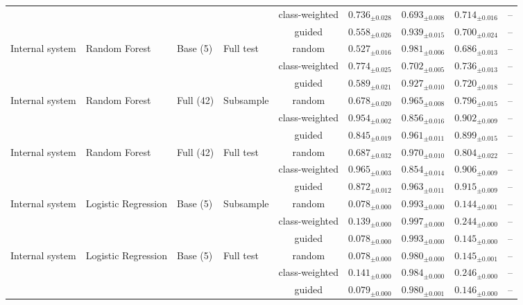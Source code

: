 \begin{longtable}{llllcccc}
 &  &  &  & class-weighted & $0.736_{\pm 0.028}$ & $0.693_{\pm 0.008}$ & $0.714_{\pm 0.016}$ & -- \\
 &  &  &  & guided & $0.558_{\pm 0.026}$ & $0.939_{\pm 0.015}$ & $0.700_{\pm 0.024}$ & -- \\
\addlinespace
Internal system & Random Forest & Base (5) & Full test & random & $0.527_{\pm 0.016}$ & $0.981_{\pm 0.006}$ & $0.686_{\pm 0.013}$ & -- \\
 &  &  &  & class-weighted & $0.774_{\pm 0.025}$ & $0.702_{\pm 0.005}$ & $0.736_{\pm 0.013}$ & -- \\
 &  &  &  & guided & $0.589_{\pm 0.021}$ & $0.927_{\pm 0.010}$ & $0.720_{\pm 0.018}$ & -- \\
\addlinespace
Internal system & Random Forest & Full (42) & Subsample & random & $0.678_{\pm 0.020}$ & $0.965_{\pm 0.008}$ & $0.796_{\pm 0.015}$ & -- \\
 &  &  &  & class-weighted & $0.954_{\pm 0.002}$ & $0.856_{\pm 0.016}$ & $0.902_{\pm 0.009}$ & -- \\
 &  &  &  & guided & $0.845_{\pm 0.019}$ & $0.961_{\pm 0.011}$ & $0.899_{\pm 0.015}$ & -- \\
\addlinespace
Internal system & Random Forest & Full (42) & Full test & random & $0.687_{\pm 0.032}$ & $0.970_{\pm 0.010}$ & $0.804_{\pm 0.022}$ & -- \\
 &  &  &  & class-weighted & $0.965_{\pm 0.003}$ & $0.854_{\pm 0.014}$ & $0.906_{\pm 0.009}$ & -- \\
 &  &  &  & guided & $0.872_{\pm 0.012}$ & $0.963_{\pm 0.011}$ & $0.915_{\pm 0.009}$ & -- \\
\addlinespace
Internal system & Logistic Regression & Base (5) & Subsample & random & $0.078_{\pm 0.000}$ & $0.993_{\pm 0.000}$ & $0.144_{\pm 0.001}$ & -- \\
 &  &  &  & class-weighted & $0.139_{\pm 0.000}$ & $0.997_{\pm 0.000}$ & $0.244_{\pm 0.000}$ & -- \\
 &  &  &  & guided & $0.078_{\pm 0.000}$ & $0.993_{\pm 0.000}$ & $0.145_{\pm 0.000}$ & -- \\
\addlinespace
Internal system & Logistic Regression & Base (5) & Full test & random & $0.078_{\pm 0.000}$ & $0.980_{\pm 0.000}$ & $0.145_{\pm 0.001}$ & -- \\
 &  &  &  & class-weighted & $0.141_{\pm 0.000}$ & $0.984_{\pm 0.000}$ & $0.246_{\pm 0.000}$ & -- \\
 &  &  &  & guided & $0.079_{\pm 0.000}$ & $0.980_{\pm 0.001}$ & $0.146_{\pm 0.000}$ & -- \\

\end{longtable}
